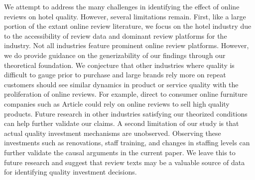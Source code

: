 \documentclass[mksc,blindrev]{informs3} %
\begin{document}
We attempt to address the many challenges in identifying the effect of online reviews on hotel quality. However, several limitations remain. First, like a large portion of the extant online review literature, we focus on the hotel industry due to the accessibility of review data and dominant review platforms for the industry. Not all industries feature prominent online review platforms. However, we do provide guidance on the generizability of our findings through our theoretical foundation. We conjecture that  other industries where quality is difficult to gauge prior to purchase and large brands rely more on repeat customers should see similar dynamics in product or service quality with the proliferation of online reviews. For example, direct to consumer online furniture companies such as Article could rely on online reviews to sell high quality products. Future research in other industries satisfying our theorized conditions can help further validate our claims. A second limitation of our study is that actual quality investment mechanisms are unobserved. Observing these investments such as renovations, staff training, and changes in staffing levels can further validate the causal arguments in the current paper. We leave this to future research and suggest that review texts may be a valuable source of data for identifying quality investment decisions.











\end{document}
